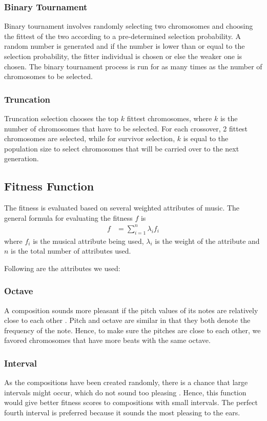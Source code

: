 \documentclass[conference]{IEEEtran}
\begin{document}
\subsubsection{Binary Tournament}
Binary tournament involves randomly selecting two chromosomes and choosing the fittest of the two according to a pre-determined selection probability. A random number is generated and if the number is lower than or equal to the selection probability, the fitter individual is chosen or else the weaker one is chosen. The binary tournament process is run for as many times as the number of chromosomes to be selected.

\subsubsection{Truncation}
Truncation selection chooses the top $k$ fittest chromosomes, where $k$ is the number of chromosomes that have to be selected. For each crossover, 2 fittest chromosomes are selected, while for survivor selection, $k$ is equal to the population size to select chromosomes that will be carried over to the next generation.

\subsection{Fitness Function}
The fitness is evaluated based on several weighted attributes of music. The general formula for evaluating the fitness $f$ is
\begin{align*}
f &= \sum_{i=1}^{n} \lambda_{i}f_{i}
\end{align*}
where $f_{i}$ is the musical attribute being used, $\lambda_{i}$ is the weight of the attribute and $n$ is the total number of attributes used.

Following are the attributes we used:

\subsubsection{Octave}
A composition sounds more pleasant if the pitch values of its notes are relatively close to each other \cite{b2}. Pitch and octave are similar in that they both denote the frequency of the note. Hence, to make sure the pitches are close to each other, we favored chromosomes that have more beats with the same octave.

\subsubsection{Interval}
As the compositions have been created randomly, there is a chance that large intervals might occur, which do not sound too pleasing \cite{b3}. Hence, this function would give better fitness scores to compositions with small intervals. The perfect fourth interval is preferred \cite{b1} because it sounds the most pleasing to the ears.
\end{document}
